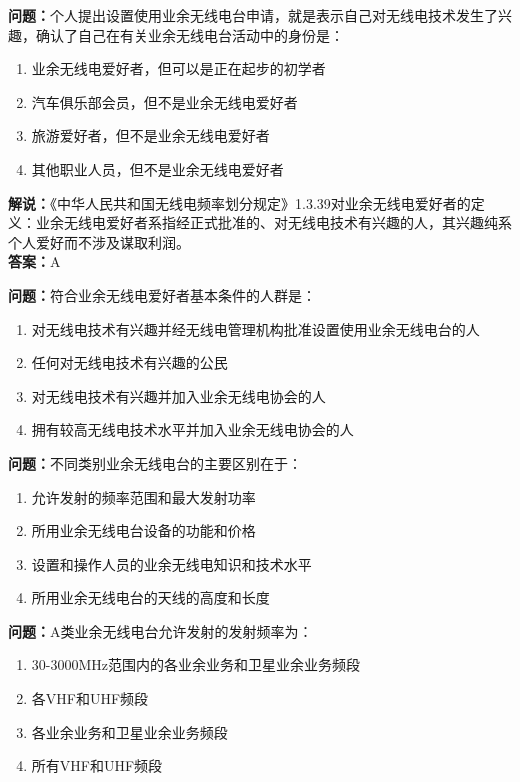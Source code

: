 \textbf{问题：}个人提出设置使用业余无线电台申请，就是表示自己对无线电技术发生了兴趣，确认了自己在有关业余无线电台活动中的身份是：
\begin{enumerate}[label=\Alph*), leftmargin=3em]
	\item 业余无线电爱好者，但可以是正在起步的初学者
	\item 汽车俱乐部会员，但不是业余无线电爱好者
	\item 旅游爱好者，但不是业余无线电爱好者
	\item 其他职业人员，但不是业余无线电爱好者
\end{enumerate}
\textbf{解说：}《中华人民共和国无线电频率划分规定》1.3.39对业余无线电爱好者的定义：业余无线电爱好者系指经正式批准的、对无线电技术有兴趣的人，其兴趣纯系个人爱好而不涉及谋取利润。\\
\textbf{答案：}A

\textbf{问题：}符合业余无线电爱好者基本条件的人群是：
\begin{enumerate}[label=\Alph*), leftmargin=3em]
	\item 对无线电技术有兴趣并经无线电管理机构批准设置使用业余无线电台的人
	\item 任何对无线电技术有兴趣的公民
	\item 对无线电技术有兴趣并加入业余无线电协会的人
	\item 拥有较高无线电技术水平并加入业余无线电协会的人
\end{enumerate}

\textbf{问题：}不同类别业余无线电台的主要区别在于：
\begin{enumerate}[label=\Alph*), leftmargin=3em]
	\item 允许发射的频率范围和最大发射功率
	\item 所用业余无线电台设备的功能和价格
	\item 设置和操作人员的业余无线电知识和技术水平
	\item 所用业余无线电台的天线的高度和长度
\end{enumerate}

\textbf{问题：}A类业余无线电台允许发射的发射频率为：
\begin{enumerate}[label=\Alph*), leftmargin=3em]
	\item 30-3000MHz范围内的各业余业务和卫星业余业务频段
	\item 各VHF和UHF频段
	\item 各业余业务和卫星业余业务频段
	\item 所有VHF和UHF频段
\end{enumerate}

